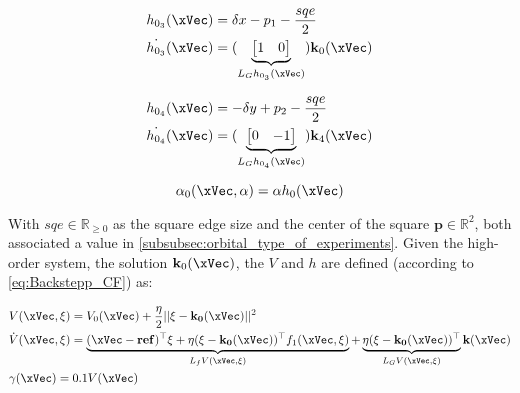 \begin{subequations}
   \begin{align}
    &h_{0_3}(\xVec) = \delta x - p_1 - \frac{sqe}{2}\label{eq:h0_3_orbital} \\
    &\dot{h_{0_3}}(\xVec) = (\underbrace{\begin{bmatrix} 1 & 0 \end{bmatrix}}_{L_Gh_{0_3}(\xVec)})\mathbf{k}_0(\xVec)  \label{eq:dot_h0_3_unicycle} 
\end{align}
\label{eq:CBF0_3_orbital}
\end{subequations}

\begin{subequations}
   \begin{align}
    &h_{0_4}(\xVec) = -\delta y + p_2 - \frac{sqe}{2}\label{eq:h0_4_orbital} \\
    &\dot{h_{0_4}}(\xVec) = (\underbrace{\begin{bmatrix} 0 & -1 \end{bmatrix}}_{L_Gh_{0_4}(\xVec)})\mathbf{k}_4(\xVec)  \label{eq:dot_h0_4_unicycle} 
\end{align}
\label{eq:CBF0_4_orbital}
\end{subequations}

\begin{equation}
  \alpha_0(\xVec, \alpha)  = \alpha h_0(\xVec) 
  \label{eq:CBF_alpha0_orbital}
\end{equation}



With  \(sqe \in \mathbb{R}_{\geq 0}\) as the square edge size and the center of the square \(\mathbf{p} \in \mathbb{R}^2\), both associated a value in \ref{subsubsec:orbital_type_of_experiments}. Given the high-order system, the solution \(\mathbf{k}_0(\xVec)\), the  \(V\) and  \(h\) are defined (according to \ref{eq:Backstepp_CF}) as:


\begin{subequations}
   \begin{align}
    &V(\xVec, \xi) = V_0(\xVec) + \frac{\eta}{2} || \xi - \mathbf{k_0(\xVec)}||^2 \label{eq:V_orbital} \\
    &\dot{V}(\xVec, \xi) = \underbrace{(\xVec-\mathbf{ref})^{\top}\xi + \eta(\xi - \mathbf{k_0(\xVec)})^{\top}f_1(\xVec, \xi)}_{L_fV(\xVec, \xi)} + \underbrace{\eta(\xi - \mathbf{k_0(\xVec)})^{\top}}_{L_GV(\xVec, \xi)} \mathbf{k}(\xVec)  \label{eq:dot_V_orbital} \\
    &\gamma(\xVec)  = 0.1 V(\xVec) \label{eq:CLF_gamma_orbital}
\end{align}
\label{eq:CLF_orbital}
\end{subequations}

